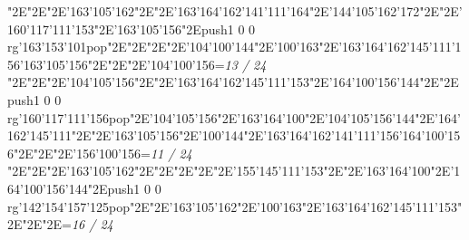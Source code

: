 \null\vfill\enskip\enskip\enskip\ipa\char"2E\enskip\enskip\enskip\ipa\char"2E\enskip\ipa\char"2E\ipa\char'163\ipa\char'105\ipa\char'162\bigskip\enskip\enskip\enskip\ipa\char"2E\enskip\enskip\enskip\ipa\char"2E\ipa\char'163\ipa\char'164\ipa\char'162\ipa\char'141\ipa\char'111\ipa\char'164\bigskip\enskip\enskip\ipa\char"2E\ipa\char'144\ipa\char'105\ipa\char'162\ipa\char'172\ipa\char"2E\enskip\ipa\char"2E\ipa\char'160\ipa\char'117\ipa\char'111\ipa\char'153\ipa\char"2E\ipa\char'163\ipa\char'105\ipa\char'156\ipa\char"2E\pdfcolorstack\match push{1 0 0 rg}\ipa\char'163\ipa\char'153\ipa\char'101\pdfcolorstack\match pop{}\ipa\char"2E\enskip\enskip\enskip\enskip\bigskip\enskip\ipa\char"2E\enskip\enskip\enskip\enskip\ipa\char"2E\enskip\enskip\ipa\char"2E\ipa\char'104\ipa\char'100\ipa\char'144\ipa\char"2E\ipa\char'100\ipa\char'163\ipa\char"2E\ipa\char'163\ipa\char'164\ipa\char'162\ipa\char'145\ipa\char'111\ipa\char'156\bigskip\ipa\char'163\ipa\char'105\ipa\char'156\ipa\char"2E\enskip\enskip\ipa\char"2E\enskip\enskip\enskip\ipa\char"2E\ipa\char'104\ipa\char'100\ipa\char'156\bigskip\vfill\footline={\hfill\tenrm\it 13 / 24}\eject
\null\vfill\enskip\enskip\enskip\ipa\char"2E\enskip\enskip\enskip\ipa\char"2E\enskip\ipa\char"2E\ipa\char'104\ipa\char'105\ipa\char'156\bigskip\enskip\enskip\enskip\ipa\char"2E\enskip\enskip\enskip\ipa\char"2E\ipa\char'163\ipa\char'164\ipa\char'162\ipa\char'145\ipa\char'111\ipa\char'153\bigskip\enskip\enskip\ipa\char"2E\ipa\char'164\ipa\char'100\ipa\char'156\ipa\char'144\ipa\char"2E\enskip\ipa\char"2E\pdfcolorstack\match push{1 0 0 rg}\ipa\char'160\ipa\char'117\ipa\char'111\ipa\char'156\pdfcolorstack\match pop{}\ipa\char"2E\ipa\char'104\ipa\char'105\ipa\char'156\ipa\char"2E\ipa\char'163\ipa\char'164\ipa\char'100\ipa\char"2E\ipa\char'104\ipa\char'105\ipa\char'156\ipa\char'144\bigskip\enskip\ipa\char"2E\ipa\char'164\ipa\char'162\ipa\char'145\ipa\char'111\ipa\char"2E\enskip\enskip\ipa\char"2E\ipa\char'163\ipa\char'105\ipa\char'156\ipa\char"2E\ipa\char'100\ipa\char'144\ipa\char"2E\ipa\char'163\ipa\char'164\ipa\char'162\ipa\char'141\ipa\char'111\ipa\char'156\bigskip\ipa\char'164\ipa\char'100\ipa\char'156\ipa\char"2E\enskip\enskip\ipa\char"2E\enskip\enskip\enskip\ipa\char"2E\ipa\char'156\ipa\char'100\ipa\char'156\bigskip\vfill\footline={\hfill\tenrm\it 11 / 24}\eject
\null\vfill\enskip\enskip\enskip\ipa\char"2E\enskip\enskip\enskip\ipa\char"2E\enskip\ipa\char"2E\enskip\enskip\enskip\bigskip\ipa\char'163\ipa\char'105\ipa\char'162\ipa\char"2E\enskip\enskip\enskip\ipa\char"2E\enskip\enskip\enskip\enskip\enskip\enskip\bigskip\enskip\enskip\ipa\char"2E\enskip\enskip\enskip\enskip\ipa\char"2E\enskip\ipa\char"2E\ipa\char'155\ipa\char'145\ipa\char'111\ipa\char'153\ipa\char"2E\enskip\enskip\enskip\ipa\char"2E\ipa\char'163\ipa\char'164\ipa\char'100\ipa\char"2E\ipa\char'164\ipa\char'100\ipa\char'156\ipa\char'144\bigskip\enskip\ipa\char"2E\pdfcolorstack\match push{1 0 0 rg}\ipa\char'142\ipa\char'154\ipa\char'157\ipa\char'125\pdfcolorstack\match pop{}\ipa\char"2E\enskip\enskip\ipa\char"2E\ipa\char'163\ipa\char'105\ipa\char'162\ipa\char"2E\ipa\char'100\ipa\char'163\ipa\char"2E\ipa\char'163\ipa\char'164\ipa\char'162\ipa\char'145\ipa\char'111\ipa\char'153\bigskip\enskip\enskip\enskip\ipa\char"2E\enskip\enskip\ipa\char"2E\enskip\enskip\enskip\ipa\char"2E\enskip\enskip\enskip\bigskip\vfill\footline={\hfill\tenrm\it 16 / 24}\eject
